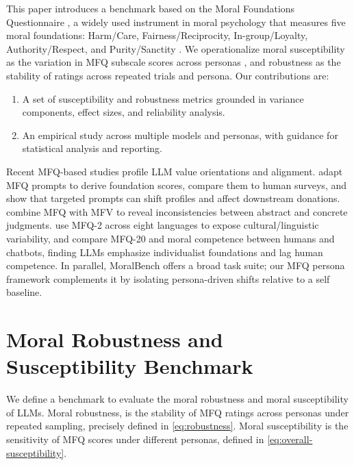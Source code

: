 \documentclass{article}
\begin{document}
This paper introduces a benchmark based on the Moral Foundations Questionnaire \citep{moralfoundations2017questionnaires}, a widely used instrument in moral psychology that measures five moral foundations: Harm/Care, Fairness/Reciprocity, In-group/Loyalty, Authority/Respect, and Purity/Sanctity \citep{graham2009liberals,haidt2007when,moralfoundations2017questionnaires}. We operationalize moral susceptibility as the variation in MFQ subscale scores across personas \citep{ge2025scalingsyntheticdatacreation}, and robustness as the stability of ratings across repeated trials and persona. Our contributions are:
\begin{enumerate}
  \item A set of susceptibility and robustness metrics grounded in variance components, effect sizes, and reliability analysis.
  \item An empirical study across multiple models and personas, with guidance for statistical analysis and reporting.
\end{enumerate}

Recent MFQ-based studies profile LLM value orientations and alignment. \citet{abdulhai-etal-2024-moral} adapt MFQ prompts to derive foundation scores, compare them to human surveys, and show that targeted prompts can shift profiles and affect downstream donations. \citet{nunes2024hypocrites} combine MFQ with MFV to reveal inconsistencies between abstract and concrete judgments. \citet{aksoy2024whose} use MFQ-2 across eight languages to expose cultural/linguistic variability, and \citet{bajpai2024insights} compare MFQ-20 and moral competence between humans and chatbots, finding LLMs emphasize individualist foundations and lag human competence. In parallel, MoralBench \citep{ji2025moralbenchmoralevaluationllms} offers a broad task suite; our MFQ persona framework complements it by isolating persona-driven shifts relative to a self baseline.

\section{Moral Robustness and Susceptibility Benchmark}

We define a benchmark to evaluate the moral robustness and moral susceptibility of LLMs. Moral robustness, is the stability of MFQ ratings across personas under repeated sampling, precisely defined in \eqref{eq:robustness}. Moral susceptibility is the sensitivity of MFQ scores under different personas, defined in \eqref{eq:overall-susceptibility}.
\end{document}
